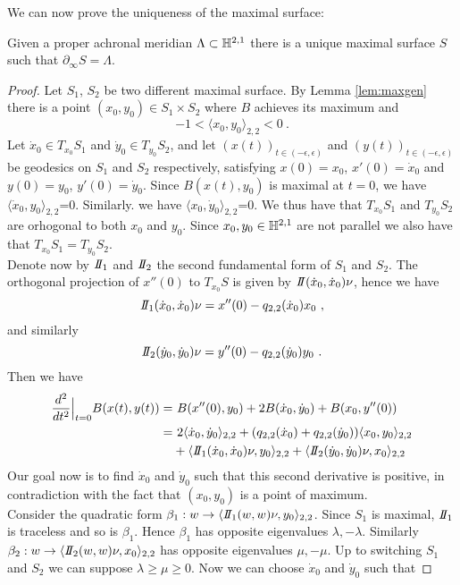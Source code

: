 We can now prove the uniqueness of the maximal surface:
\begin{theorem} \label{lem:max}
    Given a proper achronal meridian $\Lambda \subset \mathbb{H}^{2,1}$ there is a unique maximal surface $S$ such that $\partial_\infty S = \Lambda$.
\end{theorem}
\begin{proof}
    Let $S_1$, $S_2$ be two different maximal surface. By Lemma \ref{lem:maxgen} there is a point $(x_0,y_0)\in S_1 \times S_2$ where $B$ achieves its maximum and 
    \[
        -1 < \langle x_0,y_0 \rangle_{2,2} < 0 \ .
    \]
    Let $\dot{x}_0 \in T_{x_0}S_1$ and $\dot{y}_0 \in T_{y_0}S_2$, and let $(x(t))_{t\in(-\epsilon, \epsilon)}$ and $(y(t))_{t\in(-\epsilon, \epsilon)}$ be geodesics on $S_1$ and $S_2$ respectively, satisfying $x(0) = x_0$, $x'(0) = \dot{x}_0$ and $y(0) = y_0$, $y'(0) = \dot{y}_0$.
    Since $B(x(t), y_0)$ is maximal at $t=0$, we have $\langle \dot{x}_0,y_0 \rangle_{2,2}$=0. Similarly. we have $\langle x_0, \dot{y}_0 \rangle_{2,2}$=0. We thus have that $T_{x_0}S_1$ and $T_{y_0}S_2$ are orhogonal to both $x_0$ and $y_0$. Since $x_0, y_0 \in \mathbb{H}^{2,1}$ are not  parallel we also have that $T_{x_0}S_1 = T_{y_0}S_2$.\\
    Denote now by $\II_1$ and $\II_2$ the second fundamental form of $S_1$ and $S_2$.
    The orthogonal projection of $x''(0)$ to $T_{x_0} S$ is given by $\II(\dot{x}_0,\dot{x}_0)\nu$, hence we have
    \[
        \II_1(\dot{x}_0,\dot{x}_0)\nu = x''(0) - q_{2,2}(\dot{x}_0) x_0 \ ,
    \]
    and similarly
    \[
        \II_2(\dot{y}_0,\dot{y}_0)\nu = y''(0) - q_{2,2}(\dot{y}_0) y_0 \ . 
    \]
    Then we have
    \[ 
    \begin{split}
        \frac{d^2}{dt^2}\Big|_{t=0} B(x(t),y(t))  = & \ B(x''(0), y_0) + 2B(\dot{x}_0, \dot{y}_0) + B(x_0, y''(0)) \\
         = & \ 2\langle \dot{x}_0, \dot{y}_0 \rangle_{2,2} + (q_{2,2}(\dot{x}_0) + q_{2,2}(\dot{y}_0)) \langle x_0, y_0 \rangle_{2,2} \\
         & + \langle  \II_1(\dot{x}_0,\dot{x}_0)\nu , y_0 \rangle_{2,2} + \langle \II_2(\dot{y}_0,\dot{y}_0)\nu , x_0 \rangle_{2,2}
    \end{split}
    \]
    Our goal now is to find $\dot{x}_0$ and $\dot{y}_0$ such that this second derivative is positive, in contradiction with the fact that $(x_0, y_0)$ is a point of maximum.\\
    Consider the quadratic form $\beta_1 : w \to \langle  \II_1(w,w)\nu , y_0 \rangle_{2,2}$. Since $S_1$ is maximal, $\II_1$ is traceless and so is $\beta_1$. Hence $\beta_1$ has opposite eigenvalues $\lambda, -\lambda$. Similarly $\beta_2 : w \to \langle \II_2(w,w)\nu , x_0 \rangle_{2,2}$ has opposite eigenvalues $\mu,-\mu$. Up to switching $S_1$ and $S_2$ we can suppose $\lambda \geq \mu \geq 0$. Now we can choose $\dot{x}_0$ and $\dot{y}_0$ such that

\end{proof}
